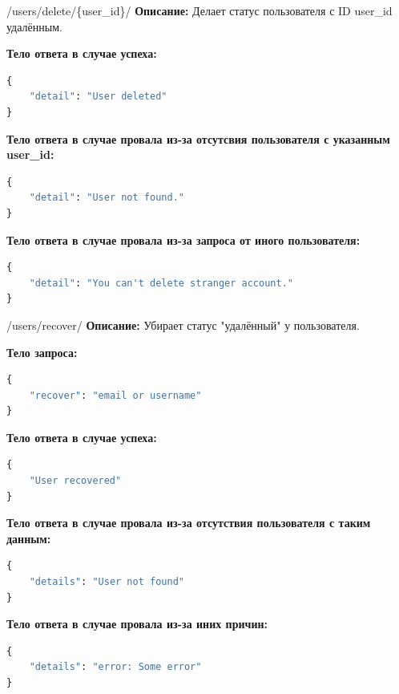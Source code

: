 \documentclass[a4paper,14pt]{extarticle}
\begin{document}
	\begin{deleteapi}{/users/delete/\{user\_id\}/}
		\textbf{Описание:} Делает статус пользователя с ID user\_id удалённым.\medskip
		
		\textbf{Тело ответа в случае успеха:}
		\begin{lstlisting}[language=Python]
{
    "detail": "User deleted"
}
		\end{lstlisting}
		
		\textbf{Тело ответа в случае провала из-за отсутсвия пользователя с указанным user\_id:}
		\begin{lstlisting}[language=Python]
{
    "detail": "User not found."
}
		\end{lstlisting}
		
		\textbf{Тело ответа в случае провала из-за запроса от иного пользователя:}
		\begin{lstlisting}[language=Python]
{
    "detail": "You can't delete stranger account."
}
		\end{lstlisting}
	\end{deleteapi}
	
	\begin{putapi}{/users/recover/}
		\textbf{Описание:} Убирает статус "удалённый" у пользователя.\medskip
		
		\textbf{Тело запроса:}
		\begin{lstlisting}[language=Python]
{
    "recover": "email or username"
}
		\end{lstlisting}
		
		\textbf{Тело ответа в случае успеха:}
		\begin{lstlisting}[language=Python]
{
    "User recovered"
}
		\end{lstlisting}
		
		\textbf{Тело ответа в случае провала из-за отсутствия пользователя с таким данным:}
		\begin{lstlisting}[language=Python]
{
    "details": "User not found"
}
		\end{lstlisting}
		
		\textbf{Тело ответа в случае провала из-за иних причин:}
		\begin{lstlisting}[language=Python]
{
    "details": "error: Some error"
}
		\end{lstlisting}
	\end{putapi}
	
\end{document}
